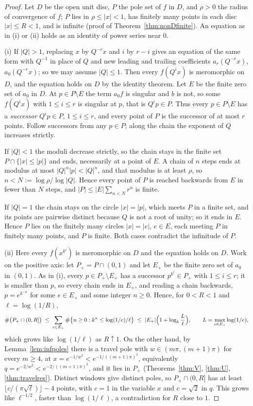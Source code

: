 \documentclass[11pt]{article}
\theoremstyle{plain}
\theoremstyle{definition}
\theoremstyle{remark}
\begin{document}
\begin{proof}
Let $D$ be the open unit disc, $P$ the pole set of $f$ in $D$, and $\rho>0$ the radius of
convergence of $f$; $P$ lies in $\rho\le|x|<1$, has finitely many points in each disc $|x|\le R<1$,
and is infinite (proof of Theorem~\ref{thm:nonDfinite}). An equation as in (i) or (ii) holds as an
identity of power series near $0$.

(i) If $|Q|>1$, replacing $x$ by $Q^{-r}x$ and $i$ by $r-i$ gives an equation of the same form with
$Q^{-1}$ in place of $Q$ and new leading and trailing coefficients $a_r(Q^{-r}x)$, $a_0(Q^{-r}x)$; so
we may assume $|Q|\le1$. Then every $f(Q^ix)$ is meromorphic on $D$, and the equation holds on $D$
by the identity theorem. Let $E$ be the finite zero set of $a_0$ in $D$. At $p\in P\setminus E$ the
term $a_0f$ is singular and $b$ is not, so some $f(Q^ix)$ with $1\le i\le r$ is singular at $p$,
that is $Q^ip\in P$. Thus every $p\in P\setminus E$ has a \emph{successor} $Q^ip\in P$, $1\le i\le
r$, and every point of $P$ is the successor of at most $r$ points. Follow successors from any $p\in
P$; along the chain the exponent of $Q$ increases strictly.

If $|Q|<1$ the moduli decrease strictly, so the chain stays in the finite set $P\cap\{|x|\le|p|\}$
and ends, necessarily at a point of $E$. A chain of $n$ steps ends at modulus at most
$|Q|^n|p|<|Q|^n$, and that modulus is at least $\rho$, so $n<N:=\log\rho/\log|Q|$. Hence every
point of $P$ is reached backwards from $E$ in fewer than $N$ steps, and $|P|\le|E|\sum_{n<N}r^n$ is
finite.

If $|Q|=1$ the chain stays on the circle $|x|=|p|$, which meets $P$ in a finite set, and its points
are pairwise distinct because $Q$ is not a root of unity; so it ends in $E$. Hence $P$ lies on the
finitely many circles $|x|=|e|$, $e\in E$, each meeting $P$ in finitely many points, and $P$ is
finite. Both cases contradict the infinitude of $P$.

(ii) Here every $f(x^{k^i})$ is meromorphic on $D$ and the equation holds on $D$. Work on the
positive axis: let $P_+=P\cap(0,1)$ and let $E_+$ be the finite zero set of $a_0$ in $(0,1)$. As in
(i), every $p\in P_+\setminus E_+$ has a successor $p^{k^i}\in P_+$ with $1\le i\le r$; it is
smaller than $p$, so every chain ends in $E_+$, and reading a chain backwards,
$p=e^{k^{-n}}$ for some $e\in E_+$ and some integer $n\ge0$. Hence, for $0<R<1$ and
$\ell=\log(1/R)$,
\[
   \#\bigl(P_+\cap(0,R]\bigr)\;\le\;\sum_{e\in E_+}\#\bigl\{n\ge0:k^n\le\log(1/e)/\ell\bigr\}
   \;\le\;|E_+|\Bigl(1+\log_k\frac L\ell\Bigr),\qquad L=\max_{e\in E_+}\log(1/e),
\]
which grows like $\log(1/\ell)$ as $R\uparrow1$. On the other hand, by Lemma~\ref{lem:infpoles}
there is a travel pole with $w\in(m\pi,(m+1)\pi)$ for every $m\ge4$, at
$x=e^{-1/w^2}<e^{-1/((m+1)\pi)^2}$, equivalently $q=e^{-2/w^2}<e^{-2/((m+1)\pi)^2}$, and it lies in
$P_+$ (Theorems~\ref{thm:V}, \ref{thm:U}, \ref{thm:travelres}). Distinct windows give distinct
poles, so $P_+\cap(0,R]$ has at least $\lfloor c/(\pi\sqrt\ell)\rfloor-4$ points, with $c=1$ in the
variable $x$ and $c=\sqrt2$ in $q$. This grows like $\ell^{-1/2}$, faster than $\log(1/\ell)$, a
contradiction for $R$ close to $1$.
\end{proof}
\end{document}
